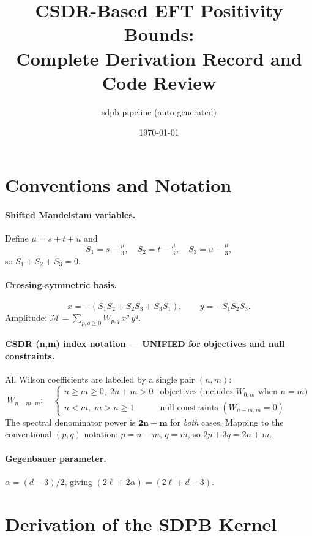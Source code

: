 \documentclass{article}
\title{CSDR-Based EFT Positivity Bounds:\\
       Complete Derivation Record and Code Review}
\author{sdpb pipeline (auto-generated)}
\date{\today}
\begin{document}
\maketitle
\tableofcontents

\section{Conventions and Notation}

\paragraph{Shifted Mandelstam variables.}
Define $\mu = s+t+u$ and
\[
  S_1 = s - \tfrac{\mu}{3},\quad S_2 = t - \tfrac{\mu}{3},\quad S_3 = u-\tfrac{\mu}{3},
\]
so $S_1+S_2+S_3=0$.

\paragraph{Crossing-symmetric basis.}
\[
  x = -(S_1 S_2+S_2 S_3+S_3 S_1),\qquad y = -S_1 S_2 S_3.
\]
Amplitude: $\mathcal{M} = \sum_{p,q\ge0} W_{p,q}\,x^p\,y^q$.

\paragraph{CSDR (n,m) index notation — UNIFIED for objectives and null constraints.}
All Wilson coefficients are labelled by a single pair $(n, m)$:
\[
  W_{n-m,\,m}:\quad
  \begin{cases}
    n \ge m \ge 0,\; 2n+m>0 & \text{objectives (includes } W_{0,m}\text{ when }n=m) \\
    n < m,\; m > n \ge 1 & \text{null constraints } (W_{n-m,m} = 0)
  \end{cases}
\]
The spectral denominator power is $\mathbf{2n+m}$ for \emph{both} cases.
Mapping to the conventional $(p,q)$ notation: $p = n-m$, $q = m$, so $2p+3q = 2n+m$.

\paragraph{Gegenbauer parameter.}
$\alpha = (d-3)/2$, giving $(2\ell+2\alpha) = (2\ell+d-3)$.

\section{Derivation of the SDPB Kernel}
\end{document}
